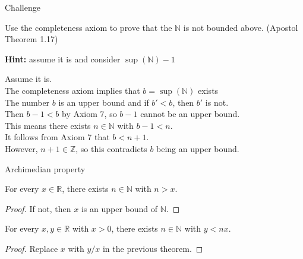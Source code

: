 \documentclass{beamer}
\begin{document}
\begin{frame}{Challenge}
\begin{prob}
Use the completeness axiom to prove that the $\mathbb N$ is not bounded above.
(Apostol Theorem 1.17)
\end{prob}
\pause
\textbf{Hint:} assume it is and consider $\sup(\mathbb N)-1$
\pause
\begin{soln}
Assume it is.\\\pause
The completeness axiom implies that $b=\sup(\mathbb N)$ exists\\\pause
The number $b$ is an upper bound and if $b' < b$, then $b'$ is not.\\\pause
Then $b-1 < b$ by Axiom 7, so $b-1$ cannot be an upper bound.\\\pause
This means there exists $n\in\mathbb N$ with $b-1 < n$.\\\pause
It follows from Axiom 7 that $b < n+1$.\\\pause
However, $n+1\in\mathbb{Z}$, so this contradicts $b$ being an upper bound.
\end{soln}
\end{frame}

\begin{frame}{Archimedian property}
\begin{thm}
For every $x\in\mathbb{R}$, there exists $n\in\mathbb N$ with $n>x$.
\end{thm}
\pause
\begin{proof}
If not, then $x$ is an upper bound of $\mathbb N$.
\end{proof}
\pause
\begin{thm}
For every $x,y\in\mathbb{R}$ with $x>0$, there exists $n\in\mathbb N$ with $y<nx$.
\end{thm}
\pause
\begin{proof}
Replace $x$ with $y/x$ in the previous theorem.
\end{proof}
\end{frame}
\end{document}
